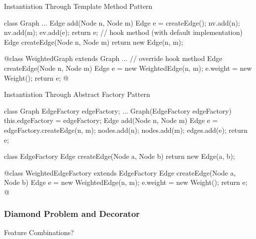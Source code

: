 \begin{frame}[fragile]{Instantiation Through Template Method Pattern}
	\small
	\begin{mycolumns}[widths={45}]
\begin{codetight}{}
class Graph {
	...
	Edge add(Node n, Node m) {
		Edge e = createEdge();
		nv.add(n); nv.add(m); ev.add(e);
		return e;
	}
	// hook method (with default implementation)
	Edge createEdge(Node n, Node m) {
		return new Edge(n, m);
	}
}
\end{codetight}
\begin{codetight}{}
@class WeightedGraph extends Graph {
	...
	// override hook method
	Edge createEdge(Node n, Node m) {
		Edge e = new WeightedEdge(n, m);
		e.weight = new Weight();
		return e;
	}
}@
\end{codetight}
	\mynextcolumn
		\centering{}
	\end{mycolumns}
\end{frame}

\begin{frame}[fragile]{Instantiation Through Abstract Factory Pattern}
	\small
	\begin{mycolumns}[b]
\begin{codetight}{}
class Graph {
	EdgeFactory edgeFactory;
	...
	Graph(EdgeFactory edgeFactory) {
		this.edgeFactory = edgeFactory;
	}
	Edge add(Node n, Node m) {
		Edge e = edgeFactory.createEdge(n, m);
		nodes.add(n); nodes.add(m); edges.add(e);
		return e;
	}
}
\end{codetight}
\begin{codetight}{}
class EdgeFactory {
	Edge createEdge(Node a, Node b) {
		return new Edge(a, b);
	}
}
\end{codetight}
	\mynextcolumn
		\centering{}	
\begin{codetight}{}
@class WeightedEdgeFactory extends EdgeFactory {
	Edge createEdge(Node a, Node b) {
		Edge e = new WeightedEdge(n, m);
		e.weight = new Weight();
		return e;
	}
}@
\end{codetight}
	\end{mycolumns}
\end{frame}

\subsubsection{Diamond Problem and Decorator}
\begin{frame}{Feature Combinations?}
	\centering{}
\end{frame}

